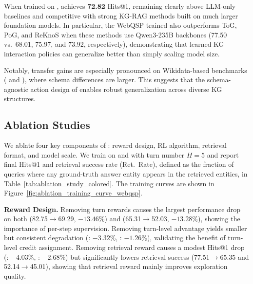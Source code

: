 When trained on , \framework{} achieves \textbf{72.82} Hits@1, remaining clearly above LLM-only baselines and competitive with strong KG-RAG methods built on much larger foundation models. In particular, the WebQSP-trained \framework{} also outperforms ToG, PoG, and ReKnoS when these methods use Qwen3-235B backbones (77.50 vs.\ 68.01, 75.97, and 73.92, respectively), demonstrating that learned KG interaction policies can generalize better than simply scaling model size.

Notably, transfer gains are especially pronounced on Wikidata-based benchmarks ( and ), where schema differences are larger. This suggests that the schema-agnostic action design of \framework{} enables robust generalization across diverse KG structures.




\subsection{Ablation Studies}
\label{sec:exp3}

We ablate four key components of \framework{}: reward design, RL algorithm, retrieval format, and model scale. We train on  and  with turn number $H=5$ and report final Hits@1 and retrieval success rate (Ret.\ Rate), defined as the fraction of queries where any ground-truth answer entity appears in the retrieved entities, in Table~\ref{tab:ablation_study_colored}. The training curves are shown in Figure~\ref{fig:ablation_training_curve_webqsp}. 




\noindent \textbf{Reward Design.}
Removing turn rewards causes the largest performance drop on both  (82.75$\rightarrow$69.29, $-13.46\%$) and  (65.31$\rightarrow$52.03, $-13.28\%$), showing the importance of per-step supervision. Removing turn-level advantage yields smaller but consistent degradation (: $-3.32\%$, : $-1.26\%$), validating the benefit of turn-level credit assignment. Removing retrieval reward causes a modest Hits@1 drop (: $-4.03\%$, : $-2.68\%$) but significantly lowers retrieval success (77.51$\rightarrow$65.35 and 52.14$\rightarrow$45.01), showing that retrieval reward mainly improves exploration quality.

